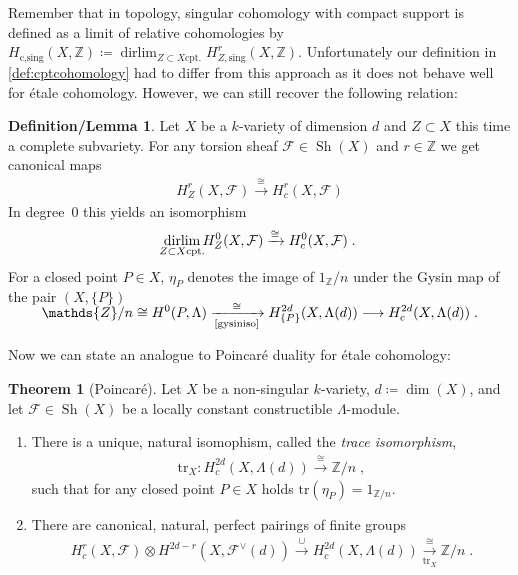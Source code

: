 \documentclass[english,headsepline=0.25pt]{scrartcl}
\theoremstyle{definition}
\newtheorem{DefLem}[Def]{Definition/Lemma}
\newtheorem{Thm}[Def]{Theorem}
\theoremstyle{remark}
\newcommand*{\Z}{\mathds{Z}}
\newcommand*{\Zmod}[1]{\Z/#1} %
\newcommand*{\F}{\mathcal{F}} %
\DeclareMathOperator*{\dirlim}{dirlim} %
\DeclareMathOperator{\Sh}{Sh} %
\newcommand*{\Tr}{\text{tr}} %
\newcommand*{\tr}[1]{\Tr\left(#1\right)} %
\begin{document}
Remember that in topology, singular cohomology with compact support is
defined as a limit of relative cohomologies by
$H_{\text{c,sing}}(X,\Z)\coloneqq
\dirlim_{Z\subset X \text{cpt.}}H_{Z,\text{sing}}^r(X,\Z)$.
Unfortunately our definition in \ref{def:cptcohomology} had to differ from
this approach as it does not behave well for étale cohomology.
However, we can still recover the following relation:
\begin{DefLem}\label{def:etapoint}
  Let $X$ be a $k$-variety of dimension $d$ and $Z\subset X$ this time
  a complete subvariety. For any torsion sheaf $\F\in\Sh(X)$ and
  $r\in\Z$ we get canonical maps
  \begin{gather*}
    H_Z^r(X,\F)\xrightarrow{\cong} H_c^r(X,\F)
  \end{gather*}
  In degree~0 this yields an isomorphism
  \begin{gather*}
    \dirlim_{\mathclap{Z\subset X \text{cpt.}}} H_Z^0(X,\F) 
    \xrightarrow{\cong} H_c^0(X,\F)\;.
  \end{gather*}
  For a closed point $P\in X$, $\eta_P$ denotes the image of
  $1_\Zmod{n}$ under the Gysin map of the pair $(X,\{P\})$
  \begin{gather*}
    \SwapAboveDisplaySkip
    \Zmod{n}
    \cong H^0(P,\Lambda)
    \xrightarrow[\text{\ref{gysiniso}}]{\cong}
    H_{\{P\}}^{2d}(X,\Lambda(d))
    \longrightarrow H_c^{2d}(X,\Lambda(d))\;.
  \end{gather*}
\end{DefLem}

Now we can state an analogue to Poincaré duality for étale cohomology:
\begin{Thm}[Poincaré]\label{poincare}
  Let $X$ be a non-singular $k$-variety,
  $d\coloneqq\dim(X)$,
  and let $\F\in\Sh(X)$ be a locally constant constructible
  $\Lambda$-module.
  \begin{enumerate}
  \item There is a unique, natural isomophism,
    called the \emph{trace isomorphism},
    \begin{gather*}
      \Tr_X\colon H_c^{2d}(X,\Lambda(d)) \xrightarrow{\cong} \Zmod{n}
      \;,
    \end{gather*}
    such that for any closed point $P\in X$ holds
    $\tr{\eta_P}=1_{\Zmod{n}}$.
  \item There are canonical, natural, perfect pairings of finite groups
    \begin{gather*}
      H_c^r(X,\F) \otimes H^{2d-r}\left(X,\F^\vee(d)\right)
      \overset\cup\longrightarrow H_c^{2d}(X,\Lambda(d))
      \xrightarrow[\Tr_X]{\cong} \Zmod{n}
      \;.
    \end{gather*}
  \end{enumerate}
\end{Thm}
\end{document}

